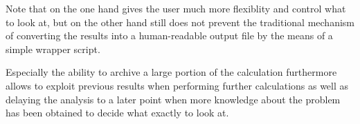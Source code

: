 Note that on the one hand gives the user much more flexiblity and control
what to look at,
but on the other hand still does not prevent the traditional
mechanism of converting the results into a human-readable output file
by the means of a simple wrapper script.

Especially the ability to archive a large portion of the calculation
furthermore allows to exploit previous results when performing
further calculations as well as delaying the analysis
to a later point when \eg more knowledge about the
problem has been obtained to decide what exactly to look at.
